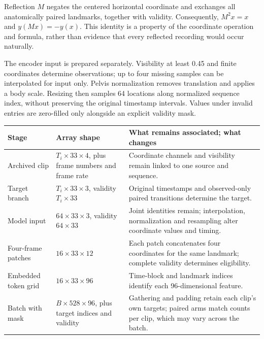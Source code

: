 \documentclass{article}
\begin{document}
Reflection \(M\) negates the centered horizontal coordinate and exchanges all anatomically paired landmarks, together with validity. Consequently, \(M^2x=x\) and \(y(Mx)=-y(x)\). This identity is a property of the coordinate operation and formula, rather than evidence that every reflected recording would occur naturally.

The encoder input is prepared separately. Visibility at least 0.45 and finite coordinates determine observations; up to four missing samples can be interpolated for input only. Pelvis normalization removes translation and applies a body scale. Resizing then samples 64 locations along normalized sequence index, without preserving the original timestamp intervals. Values under invalid entries are zero-filled only alongside an explicit validity mask.

\begin{table}[htbp]
\centering
\small
\begin{tabular}{@{}
  >{\raggedright\arraybackslash}p{}
  >{\raggedright\arraybackslash}p{}
  >{\raggedright\arraybackslash}p{}@{}}
\toprule\noalign{}
\begin{minipage}[b]{\linewidth}\raggedright
Stage
\end{minipage} & \begin{minipage}[b]{\linewidth}\raggedright
Array shape
\end{minipage} & \begin{minipage}[b]{\linewidth}\raggedright
What remains associated; what changes
\end{minipage} \\
\midrule\noalign{}

Archived clip & \(T_i\times33\times4\), plus frame numbers and frame rate & Coordinate channels and visibility remain linked to one source and sequence. \\
Target branch & \(T_i\times33\times3\), validity \(T_i\times33\) & Original timestamps and observed-only paired transitions determine the target. \\
Model input & \(64\times33\times3\), validity \(64\times33\) & Joint identities remain; interpolation, normalization and resampling alter coordinate values and timing. \\
Four-frame patches & \(16\times33\times12\) & Each patch concatenates four coordinates for the same landmark; complete validity determines eligibility. \\
Embedded token grid & \(16\times33\times96\) & Time-block and landmark indices identify each 96-dimensional feature. \\
Batch with mask & \(B\times528\times96\), plus target indices and validity & Gathering and padding retain each clip's own targets; paired arms match counts per clip, which may vary across the batch. \\
\bottomrule
\end{tabular}
\end{table}
\end{document}

